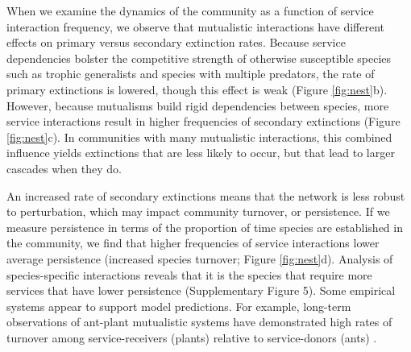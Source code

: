 \documentclass[twocolumn,preprintnumbers,amsmath,amssymb,superscriptaddress,linenumbers]{revtex4-1}
\begin{document}
When we examine the dynamics of the community as a function of service interaction frequency, we observe that mutualistic interactions have different effects on primary versus secondary extinction rates.
Because service dependencies bolster the competitive strength of otherwise susceptible species such as trophic generalists and species with multiple predators, the rate of primary extinctions is lowered, though this effect is weak (Figure \ref{fig:nest}b).
However, because mutualisms build rigid dependencies between species, more service interactions result in higher frequencies of secondary extinctions (Figure \ref{fig:nest}c). 
In communities with many mutualistic interactions, this combined influence yields extinctions that are less likely to occur, but that lead to larger cascades when they do.

An increased rate of secondary extinctions means that the network is less robust to perturbation, which may impact community turnover, or persistence.
If we measure persistence in terms of the proportion of time species are established in the community, we find that higher frequencies of service interactions lower average persistence (increased species turnover; Figure \ref{fig:nest}d).
Analysis of species-specific interactions reveals that it is the species that require more services that have lower persistence (Supplementary Figure 5). %
Some empirical systems appear to support model predictions.
For example, long-term observations of ant-plant mutualistic systems have demonstrated high rates of turnover among service-receivers (plants) relative to service-donors (ants) \cite{DiazCastelazo2013}. %
\end{document}
